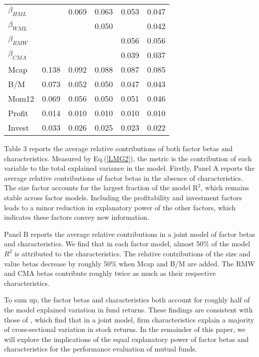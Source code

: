\begin{singlespacing}
\begin{table}[h!]
\begin{tabular}{lrrrrr}
$\beta_{HML}$               &             & 0.069     & 0.063     & 0.053     & 0.047     \\
$\beta_{WML}$             &             &           & 0.050     &           & 0.042     \\
$\beta_{RMW}$               &             &           &           & 0.056     & 0.056     \\
$\beta_{CMA}$               &             &           &           & 0.039     & 0.037     \\
Mcap         & 0.138       & 0.092     & 0.088     & 0.087     & 0.085     \\
B/M          & 0.073       & 0.052     & 0.050     & 0.047     & 0.043     \\
Mom12        & 0.069       & 0.056     & 0.050     & 0.051     & 0.046     \\
Profit       & 0.014       & 0.010     & 0.010     & 0.010     & 0.010     \\
Invest       & 0.033       & 0.026     & 0.025     & 0.023     & 0.022        \\ \hline
\end{tabular}
\end{table}
\end{singlespacing}
\vspace{-0.475cm}
\par Table 3 reports the average relative contributions of both factor betas and characteristics. Measured by Eq.(\ref{LMG2}), the \citet{lindeman1980introduction} metric is the contribution of each variable to the total explained variance in the model. Firstly, Panel A reports the average relative contributions of factor betas in the absence of characteristics. The size factor accounts for the largest fraction of the model $\text{R}^2$, which remains stable across factor models. Including the profitability and investment factors leads to a minor reduction in explanatory power of the other factors, which indicates these factors convey new information. 
\par 
Panel B reports the average relative contributions in a joint model of factor betas and characteristics. We find that in each factor model, almost 50\% of the model $R^2$ is attributed to the characteristics. The relative contributions of the size and value betas decrease by roughly 50\% when Mcap and B/M are added. The RMW and CMA betas contribute roughly twice as much as their respective characteristics.  
\par To sum up, the factor betas and characteristics both account for roughly half of the model explained variation in fund returns. These findings are consistent with those of \citet{chordia2015cross}, which find that in a joint model, firm characteristics explain a majority of cross-sectional variation in stock returns. In the remainder of this paper, we will explore the implications of the equal explanatory power of factor betas and characteristics for the performance evaluation of mutual funds. 



